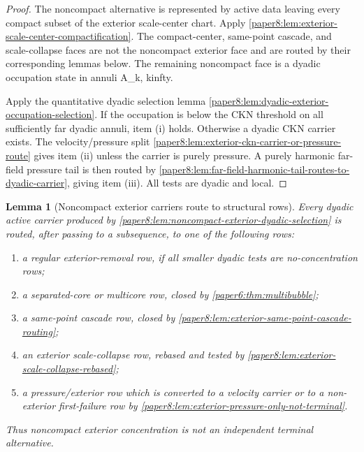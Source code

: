 \documentclass[11pt]{amsart}
\def\({}%
\def\){}%
\def\infty{infty}%
\theoremstyle{plain}
\newtheorem{lemma}[lemma]{Lemma}
\theoremstyle{definition}
\theoremstyle{remark}
\begin{document}
\begin{proof}
The noncompact alternative is represented by active data leaving every compact
subset of the exterior scale-center chart.  Apply
\cref{paper8:lem:exterior-scale-center-compactification}.  The compact-center,
same-point cascade, and scale-collapse faces are not the noncompact exterior
face and are routed by their corresponding lemmas below.  The remaining
noncompact face is a dyadic occupation state in annuli \(\mathcal A_k\),
\(k\to\infty\).
\par
Apply the quantitative dyadic selection lemma
\cref{paper8:lem:dyadic-exterior-occupation-selection}.  If the occupation is
below the CKN threshold on all sufficiently far dyadic annuli, item
\textup{(i)} holds.  Otherwise a dyadic CKN carrier exists.  The velocity/pressure
split
\cref{paper8:lem:exterior-ckn-carrier-or-pressure-route} gives item
\textup{(ii)} unless the carrier is purely pressure.  A purely harmonic
far-field pressure tail is then routed by
\cref{paper8:lem:far-field-harmonic-tail-routes-to-dyadic-carrier}, giving item
\textup{(iii)}.  All tests are dyadic and local.
\end{proof}

\begin{lemma}[Noncompact exterior carriers route to structural rows]
\label{paper8:lem:noncompact-exterior-structural-route}
\label{paper8:lem:noncompact-exterior-routes-to-structural-row}
Every dyadic active carrier produced by
\cref{paper8:lem:noncompact-exterior-dyadic-selection} is routed, after passing
to a subsequence, to one of the following rows:
\begin{enumerate}[label=\textup{(\roman*)}]
\item a regular exterior-removal row, if all smaller dyadic tests are
no-concentration rows;
\item a separated-core or multicore row, closed by
\cref{paper6:thm:multibubble};
\item a same-point cascade row, closed by
\cref{paper8:lem:exterior-same-point-cascade-routing};
\item an exterior scale-collapse row, rebased and tested by
\cref{paper8:lem:exterior-scale-collapse-rebased};
\item a pressure/exterior row which is converted to a velocity carrier or to a
non-exterior first-failure row by
\cref{paper8:lem:exterior-pressure-only-not-terminal}.
\end{enumerate}
Thus noncompact exterior concentration is not an independent terminal
alternative.
\end{lemma}
\end{document}
